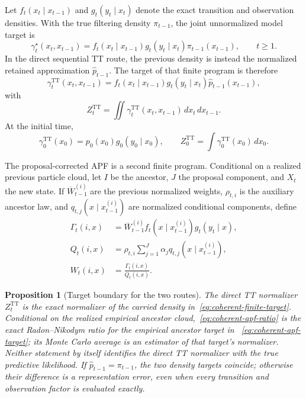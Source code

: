 \documentclass[11pt]{article}
\newtheorem{proposition}{Proposition}
\begin{document}
Let $f_t(x_t\mid x_{t-1})$ and $g_t(y_t\mid x_t)$ denote the exact transition
and observation densities. With the true filtering density $\pi_{t-1}$, the
joint unnormalized model target is
\begin{equation}\label{eq:coherent-true-target}
  \gamma_t^\star(x_t,x_{t-1})
  =f_t(x_t\mid x_{t-1})g_t(y_t\mid x_t)\pi_{t-1}(x_{t-1}),
  \qquad t\geq1.
\end{equation}
In the direct sequential TT route, the previous density is instead the
normalized retained approximation $\widehat p_{t-1}$. The target of that
finite program is therefore
\begin{equation}\label{eq:coherent-finite-target}
  \gamma_t^{\mathrm{TT}}(x_t,x_{t-1})
  =f_t(x_t\mid x_{t-1})g_t(y_t\mid x_t)\widehat p_{t-1}(x_{t-1}),
\end{equation}
with
\begin{equation}\label{eq:coherent-finite-normalizer}
  Z_t^{\mathrm{TT}}=\iint\gamma_t^{\mathrm{TT}}(x_t,x_{t-1})\,dx_t\,dx_{t-1}.
\end{equation}
At the initial time,
\begin{equation}\label{eq:coherent-initial-target}
  \gamma_0^{\mathrm{TT}}(x_0)=p_0(x_0)g_0(y_0\mid x_0),
  \qquad Z_0^{\mathrm{TT}}=\int\gamma_0^{\mathrm{TT}}(x_0)\,dx_0.
\end{equation}

The proposal-corrected APF is a second finite program. Conditional on a
realized previous particle cloud, let $I$ be the ancestor, $J$ the proposal
component, and $X_t$ the new state. If $\overline W_{t-1}^{(i)}$ are the
previous normalized weights, $\rho_{t,i}$ is the auxiliary ancestor law, and
$q_{t,j}(x\mid x_{t-1}^{(i)})$ are normalized conditional components, define
\begin{align}
  \Gamma_t(i,x)
  &=\overline W_{t-1}^{(i)}f_t(x\mid x_{t-1}^{(i)})g_t(y_t\mid x),
  \label{eq:coherent-apf-target}\\
  Q_t(i,x)
  &=\rho_{t,i}\sum_{j=1}^J\alpha_jq_{t,j}(x\mid x_{t-1}^{(i)}),
  \label{eq:coherent-apf-proposal}\\
  W_t(i,x)
  &=\frac{\Gamma_t(i,x)}{Q_t(i,x)}.
  \label{eq:coherent-apf-ratio}
\end{align}

\begin{proposition}[Target boundary for the two routes]
\label{prop:coherent-target-boundary}
The direct TT normalizer $Z_t^{\mathrm{TT}}$ is the exact normalizer of the
carried density in~\eqref{eq:coherent-finite-target}. Conditional on the
realized empirical ancestor cloud,~\eqref{eq:coherent-apf-ratio} is the exact
Radon--Nikodym ratio for the empirical ancestor target in
~\eqref{eq:coherent-apf-target}; its Monte Carlo average is an estimator of
that target's normalizer. Neither statement by itself identifies the direct TT
normalizer with the true predictive likelihood. If
$\widehat p_{t-1}=\pi_{t-1}$, the two density targets coincide; otherwise their
difference is a representation error, even when every transition and
observation factor is evaluated exactly.
\end{proposition}
\end{document}
